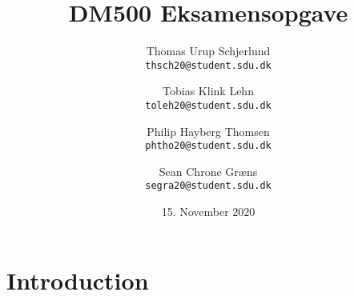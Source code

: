 \documentclass{article}
\title{DM500 Eksamensopgave}
\author{
	Thomas Urup Schjerlund\\
	\texttt{thsch20@student.sdu.dk}
	\and
	Tobias Klink Lehn\\
	\texttt{toleh20@student.sdu.dk}
	\and
	Philip Hayberg Thomsen\\
	\texttt{phtho20@student.sdu.dk}
	\and
	Sean Chrone Græns\\
	\texttt{segra20@student.sdu.dk}
}
\date{15. November 2020}
\begin{document}
\begin{titlepage}
\maketitle
\end{titlepage}

\section{Introduction}
\end{document}
